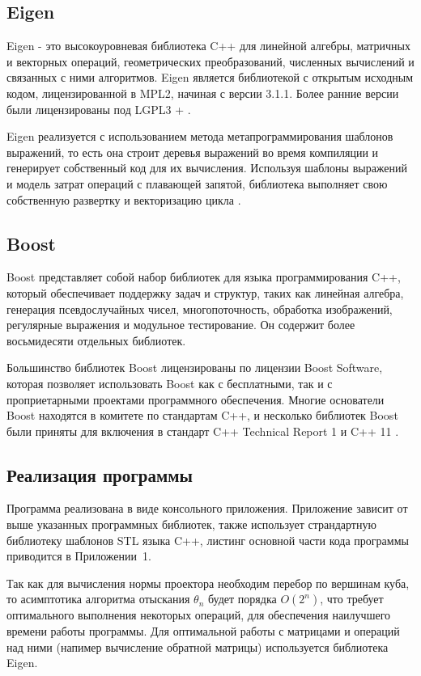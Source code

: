 \documentclass[12pt, a4paper]{extarticle}
\begin{document}
\subsection{Eigen}
Eigen - это высокоуровневая библиотека C++  для линейной алгебры, матричных и векторных операций, геометрических преобразований, численных вычислений и связанных с ними алгоритмов. Eigen является библиотекой с открытым исходным кодом, лицензированной в MPL2, начиная с версии 3.1.1. Более ранние версии были лицензированы под LGPL3 + \cite{3}.

Eigen реализуется с использованием метода метапрограммирования шаблонов выражений, то есть она строит деревья выражений во время компиляции и генерирует собственный код для их вычисления. Используя шаблоны выражений и модель затрат операций с плавающей запятой, библиотека выполняет свою собственную развертку и векторизацию цикла \cite{4}.

\subsection{Boost}
Boost представляет собой набор библиотек для языка программирования C++, который обеспечивает поддержку задач и структур, таких как линейная алгебра, генерация псевдослучайных чисел, многопоточность, обработка изображений, регулярные выражения и модульное тестирование. Он содержит более восьмидесяти отдельных библиотек.

Большинство библиотек Boost лицензированы по лицензии Boost Software, которая позволяет использовать Boost как с бесплатными, так и с проприетарными проектами программного обеспечения. Многие основатели Boost находятся в комитете по стандартам C++, и несколько библиотек Boost были приняты для включения в стандарт C++ Technical Report 1 и C++ 11 \cite{5}.

\subsection{Реализация программы}
Программа реализована в виде консольного приложения. Приложение зависит от выше указанных программных библиотек, также использует страндартную библиотеку шаблонов STL языка C++, листинг основной части кода программы приводится в Приложении~1. 

Так как для вычисления нормы проектора необходим перебор по вершинам куба, то асимптотика алгоритма отыскания $\theta_n$ будет порядка $O(2^n)$, что требует оптимального выполнения некоторых операций, для обеспечения наилучшего времени работы программы. Для оптимальной работы с матрицами и операций над ними (напимер вычисление обратной матрицы) используется библиотека Eigen.
\end{document}
